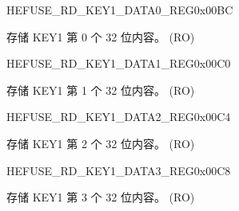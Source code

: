\begin{register}{H}{EFUSE\_RD\_KEY1\_DATA0\_REG}{0x00BC}\label{regdesc:EFUSERDKEY1DATA0REG}
%
\regnewline%
\begin{regdesc}\begin{reglist}
\label{fielddesc:EFUSEKEY1DATA0}\item [EFUSE\_KEY1\_DATA0] 存储 KEY1 第 0 个 32 位内容。 (RO)
\end{reglist}\end{regdesc}
\end{register}


\begin{register}{H}{EFUSE\_RD\_KEY1\_DATA1\_REG}{0x00C0}\label{regdesc:EFUSERDKEY1DATA1REG}
%
\regnewline%
\begin{regdesc}\begin{reglist}
\label{fielddesc:EFUSEKEY1DATA1}\item [EFUSE\_KEY1\_DATA1] 存储 KEY1 第 1 个 32 位内容。 (RO)
\end{reglist}\end{regdesc}
\end{register}


\begin{register}{H}{EFUSE\_RD\_KEY1\_DATA2\_REG}{0x00C4}\label{regdesc:EFUSERDKEY1DATA2REG}
%
\regnewline%
\begin{regdesc}\begin{reglist}
\label{fielddesc:EFUSEKEY1DATA2}\item [EFUSE\_KEY1\_DATA2] 存储 KEY1 第 2 个 32 位内容。 (RO)
\end{reglist}\end{regdesc}
\end{register}


\begin{register}{H}{EFUSE\_RD\_KEY1\_DATA3\_REG}{0x00C8}\label{regdesc:EFUSERDKEY1DATA3REG}
%
\regnewline%
\begin{regdesc}\begin{reglist}
\label{fielddesc:EFUSEKEY1DATA3}\item [EFUSE\_KEY1\_DATA3] 存储 KEY1 第 3 个 32 位内容。 (RO)
\end{reglist}\end{regdesc}
\end{register}


